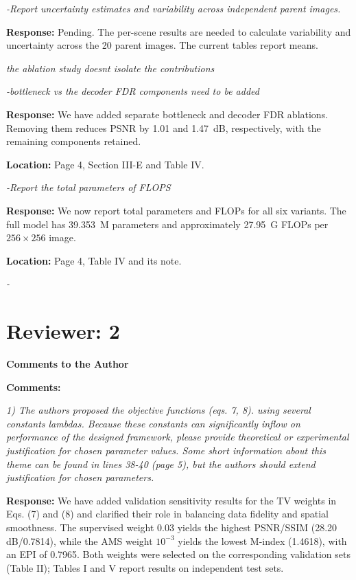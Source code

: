 \documentclass[11pt,letterpaper]{article}
\newcommand{\reviewgroup}[1]{%
  \Needspace{5\baselineskip}%
  \medskip\textit{#1}\par
}
\begin{document}
\textit{-Report uncertainty estimates and variability across independent parent images.}

\textbf{Response:} Pending. The per-scene results are needed to calculate variability and uncertainty across the 20 parent images. The current tables report means.

\reviewgroup{the ablation study doesn\textquotesingle{}t isolate the contributions}

\textit{-bottleneck vs the decoder FDR components need to be added}

\textbf{Response:} We have added separate bottleneck and decoder FDR ablations. Removing them reduces PSNR by 1.01 and 1.47~dB, respectively, with the remaining components retained.

\textbf{Location:} Page 4, Section III-E and Table IV.

\textit{-Report the total parameters of FLOPS}

\textbf{Response:} We now report total parameters and FLOPs for all six variants. The full model has 39.353~M parameters and approximately 27.95~G FLOPs per \(256\times256\) image.

\textbf{Location:} Page 4, Table IV and its note.

\textit{-}

\section*{Reviewer: 2}
\textbf{Comments to the Author}\par
\textbf{Comments:}

\textit{1) The authors proposed the objective functions (eqs. 7, 8). using several constants lambdas. Because these constants can significantly inflow on performance of the designed framework, please provide theoretical or experimental justification for chosen parameter values. Some short information about this theme can be found in lines 38-40 (page 5), but the authors should extend justification for chosen parameters.}

\medskip
\textbf{Response:} We have added validation sensitivity results for the TV weights in Eqs. (7) and (8) and clarified their role in balancing data fidelity and spatial smoothness. The supervised weight 0.03 yields the highest PSNR/SSIM (28.20 dB/0.7814), while the AMS weight \(10^{-3}\) yields the lowest M-index (1.4618), with an EPI of 0.7965. Both weights were selected on the corresponding validation sets (Table II); Tables I and V report results on independent test sets.
\end{document}
